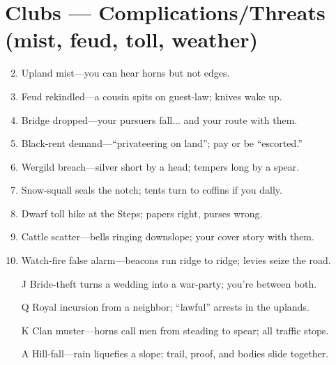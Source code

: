 \section*{Clubs --- Complications/Threats (mist, feud, toll, weather)}
\label{sec:ubral-complications}
\begin{enumerate}
\setcounter{enumi}{1}
\item Upland mist---you can hear horns but not edges.
\item Feud rekindled---a cousin spits on guest-law; knives wake up.
\item Bridge dropped---your pursuers fall... and your route with them.
\item Black-rent demand---``privateering on land''; pay or be ``escorted.''
\item Wergild breach---silver short by a head; tempers long by a spear.
\item Snow-squall seals the notch; tents turn to coffins if you dally.
\item Dwarf toll hike at the Steps; papers right, purses wrong.
\item Cattle scatter---bells ringing downslope; your cover story with them.
\item Watch-fire false alarm---beacons run ridge to ridge; levies seize the road.
\item[J] Bride-theft turns a wedding into a war-party; you're between both.
\item[Q] Royal incursion from a neighbor; ``lawful'' arrests in the uplands.
\item[K] Clan muster---horns call men from steading to spear; all traffic stops.
\item[A] Hill-fall---rain liquefies a slope; trail, proof, and bodies slide together.
\end{enumerate}

